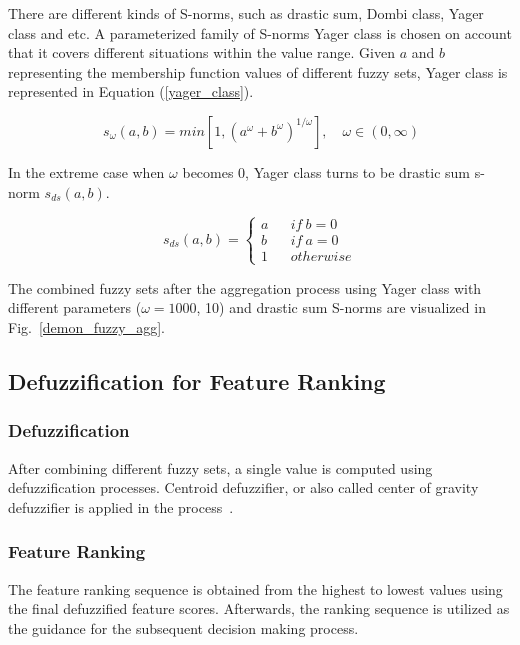 \documentclass[conference]{IEEEtran}
\begin{document}
There are different kinds of S-norms, such as drastic sum, Dombi class, Yager class and etc. A parameterized family of S-norms Yager class is chosen on account that it covers different situations within the value range. Given $a$ and $b$ representing the membership function values of different fuzzy sets, Yager class is represented in Equation (\ref{yager_class}).

\begin{equation}~\label{yager_class}
	s_{\omega}(a, b) = min[1, (a^{\omega} + b^{\omega} )^{1/\omega}], \quad \omega \in (0, \infty)
\end{equation}

In the extreme case when $\omega$ becomes 0, Yager class turns to be drastic sum s-norm $s_{ds}(a, b)$.

\begin{equation}
	s_{ds}(a, b) = \left\{
	\begin{aligned}
		a  &  & if \ b  =  0 \\
		b  &  & if \ a=0 \\
		1  &  & otherwise
	\end{aligned}
	\right.
\end{equation}

The combined fuzzy sets after the aggregation process using Yager class with different parameters ($\omega=1000$, 10) and drastic sum S-norms are visualized in Fig.~\ref{demon_fuzzy_agg}.



\subsection{Defuzzification for Feature Ranking}
\subsubsection{\textbf{Defuzzification}}
After combining different fuzzy sets, a single value is computed using defuzzification processes. Centroid defuzzifier, or also called center of gravity defuzzifier is applied in the process~\cite{wang1996course}.

\subsubsection{\textbf{Feature Ranking}}
The feature ranking sequence is obtained from the highest to lowest values using the final defuzzified feature scores. Afterwards, the ranking sequence is utilized as the guidance for the subsequent decision making process.
\end{document}
